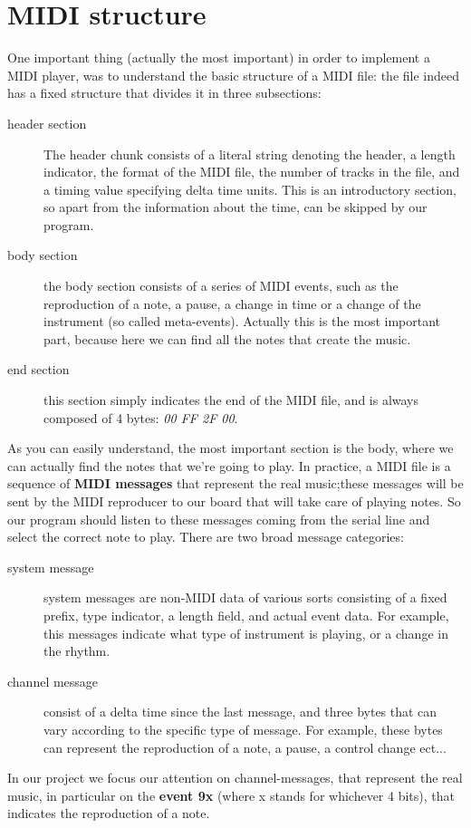 \documentclass[12pt]{article}
\begin{document}
\section{MIDI structure} \label{sec:structure}
One important thing (actually the most important) in order to implement a MIDI player, was to understand the basic structure of a MIDI file: the file indeed has a fixed structure that divides it in three subsections: 
\begin{description} 
	\item[header section] The header chunk consists of a literal string denoting the header, a length indicator, the format of the MIDI file, the number of tracks in the file, and a timing value specifying delta time units. This is an introductory section, so apart from the information about the time, can be skipped by our program.
	\item[body section] the body section consists of a series of MIDI events, such as the reproduction of a note, a pause, a change in time or a change of the instrument (so called meta-events). Actually this is the most important part, because here we can find all the notes that create the music.
	\item[end section] this section simply indicates the end of the MIDI file, and is always composed of 4 bytes: \emph{00 FF 2F 00}.
\end{description}
As you can easily understand, the most important section is the body, where we can actually find the notes that we're going to play. In practice, a MIDI file is a sequence of \textbf{MIDI messages} that represent the real music;these messages will be sent by the MIDI reproducer to our board that will take care of playing notes. So our program should listen to these messages coming from the serial line and select the correct note to play.\newline 
There are two broad message categories: 
\begin{description} 
	\item[system message] system messages are non-MIDI data of various sorts consisting of a fixed prefix, type indicator, a length field, and actual event data. For example, this messages indicate what type of instrument is playing, or a change in the rhythm.
	\item[channel message] consist of a delta time since the last message, and three bytes that can vary according to the specific type of message. For example, these bytes can represent the reproduction of a note, a pause, a control change ect...
\end{description}
In our project we focus our attention on channel-messages, that represent the real music, in particular on the \textbf{event 9x} (where x stands for whichever 4 bits), that indicates the reproduction of a note.
\end{document}
